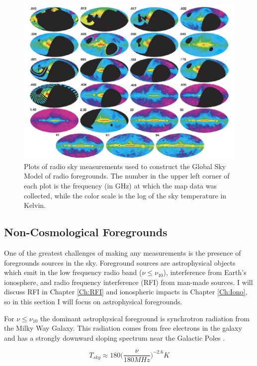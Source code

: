 \begin{figure}[htb]
\begin{center}
\includegraphics[width=0.95\linewidth]{Introduction/figures/GSM_maps.jpg}
\caption{Plots of radio sky measurements used to construct the Global Sky Model \cite{GSM_model} of radio foregrounds. The number in the upper left corner of each plot is the frequency (in GHz) at which the map data was collected, while the color scale is the log of the sky temperature in Kelvin.}
\label{Fig:GSM_maps}
\end{center}
\end{figure}

\subsection{Non-Cosmological Foregrounds}
One of the greatest challenges of making any \cm measurements is the presence of foregrounds sources in the sky. Foreground sources are astrophysical objects which emit in the low frequency radio band ($\nu \leq \nu_{10}$), interference from Earth's ionosphere, and radio frequency interference (RFI) from man-made sources. I will discuss RFI in Chapter \ref{Ch:RFI} and ionospheric impacts in Chapter \ref{Ch:Iono}, so in this section I will focus on astrophysical foregrounds. 

For $\nu \leq \nu_{10}$ the dominant astrophysical foreground is synchrotron radiation from the Milky Way Galaxy. This radiation comes from free electrons in the galaxy and has a strongly downward sloping spectrum near the Galactic Poles \cite{furlanetto_2006}. 

\begin{equation}\label{Eq:T_sky}
T_{sky} \approx 180 \Big( \frac{\nu}{180 MHz} \Big)^{-2.6} K
\end{equation}


